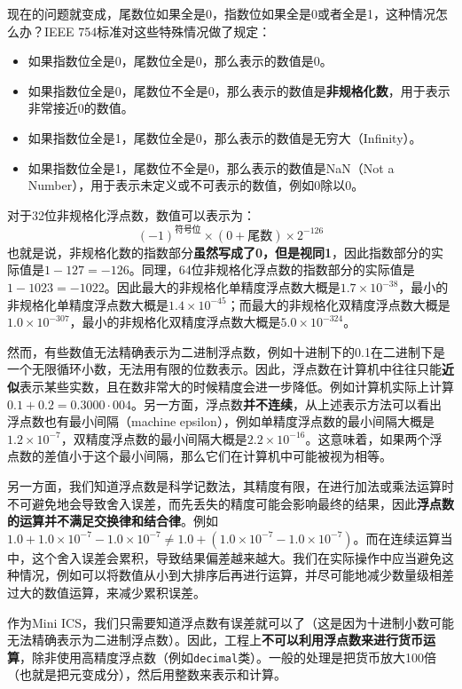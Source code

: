 现在的问题就变成，尾数位如果全是0，指数位如果全是0或者全是1，这种情况怎么办？IEEE 754标准对这些特殊情况做了规定：
\begin{itemize}
  \item 如果指数位全是0，尾数位全是0，那么表示的数值是0。
  \item 如果指数位全是0，尾数位不全是0，那么表示的数值是\textbf{非规格化数}，用于表示非常接近0的数值。
  \item 如果指数位全是1，尾数位全是0，那么表示的数值是无穷大（Infinity）。
  \item 如果指数位全是1，尾数位不全是0，那么表示的数值是NaN（Not a Number），用于表示未定义或不可表示的数值，例如0除以0。
\end{itemize}
对于32位非规格化浮点数，数值可以表示为：
$$(-1)^{\text{符号位}} \times (0 + \text{尾数}) \times 2^{-126}$$
也就是说，非规格化数的指数部分\textbf{虽然写成了0，但是视同1}，因此指数部分的实际值是$1-127=-126$。同理，64位非规格化浮点数的指数部分的实际值是$1-1023=-1022$。因此最大的非规格化单精度浮点数大概是$1.7 \times 10^{-38}$，最小的非规格化单精度浮点数大概是$1.4 \times 10^{-45}$；而最大的非规格化双精度浮点数大概是$1.0 \times 10^{-307}$，最小的非规格化双精度浮点数大概是$5.0 \times 10^{-324}$。

然而，有些数值无法精确表示为二进制浮点数，例如十进制下的0.1在二进制下是一个无限循环小数，无法用有限的位数表示。因此，浮点数在计算机中往往只能\textbf{近似}表示某些实数，且在数非常大的时候精度会进一步降低。例如计算机实际上计算$0.1+0.2=0.3000\cdot004$。另一方面，浮点数\textbf{并不连续}，从上述表示方法可以看出浮点数也有最小间隔（machine epsilon），例如单精度浮点数的最小间隔大概是$1.2 \times 10^{-7}$，双精度浮点数的最小间隔大概是$2.2 \times 10^{-16}$。这意味着，如果两个浮点数的差值小于这个最小间隔，那么它们在计算机中可能被视为相等。

另一方面，我们知道浮点数是科学记数法，其精度有限，在进行加法或乘法运算时不可避免地会导致舍入误差，而先丢失的精度可能会影响最终的结果，因此\textbf{浮点数的运算并不满足交换律和结合律}。例如$1.0 + 1.0 \times 10^{-7} - 1.0 \times 10^{-7} \neq 1.0 + (1.0 \times 10^{-7} - 1.0 \times 10^{-7})$。而在连续运算当中，这个舍入误差会累积，导致结果偏差越来越大。我们在实际操作中应当避免这种情况，例如可以将数值从小到大排序后再进行运算，并尽可能地减少数量级相差过大的数值运算，来减少累积误差。

作为Mini ICS，我们只需要知道浮点数有误差就可以了（这是因为十进制小数可能无法精确表示为二进制浮点数）。因此，工程上\textbf{不可以利用浮点数来进行货币运算}，除非使用高精度浮点数（例如\texttt{decimal}类）。一般的处理是把货币放大100倍（也就是把元变成分），然后用整数来表示和计算。

